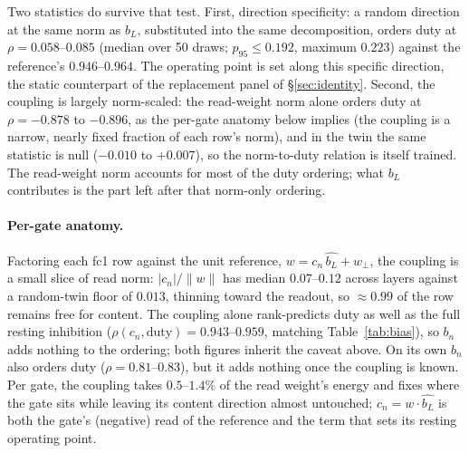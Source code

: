 \documentclass[11pt]{article}
\newcommand{\bl}{b_L}
\begin{document}
Two statistics do survive that test. First, direction specificity: a
random direction at the same norm as $\bl$, substituted into the same
decomposition, orders duty at $\rho = 0.058$--$0.085$ (median over 50
draws; $p_{95} \leq 0.192$, maximum $0.223$) against the reference's
$0.946$--$0.964$. The operating point is set along this specific
direction, the static counterpart of the replacement panel of \S\ref{sec:identity}. Second, the coupling is
largely norm-scaled: the read-weight norm alone orders duty at
$\rho = -0.878$ to $-0.896$, as the per-gate anatomy below implies (the coupling is a
narrow, nearly fixed fraction of each row's norm), and in the twin the same statistic is null ($-0.010$ to
$+0.007$), so the norm-to-duty relation is itself trained. The
read-weight norm accounts for most of the duty ordering; what $\bl$
contributes is the part left after that norm-only ordering.

\paragraph{Per-gate anatomy.} Factoring each fc1 row against the unit
reference, $w = c_n\,\hat{\bl} + w_\perp$, the coupling is a small
slice of read norm: $|c_n|/\|w\|$ has median $0.07$--$0.12$ across
layers against a random-twin floor of $0.013$, thinning toward the
readout, so $\approx 0.99$ of the row remains free for content. The
coupling alone rank-predicts duty as well as the full resting
inhibition ($\rho(c_n,\text{duty}) = 0.943$--$0.959$, matching
Table~\ref{tab:bias}), so $b_n$ adds nothing to the ordering; both
figures inherit the caveat above. On its own $b_n$ also orders
duty ($\rho = 0.81$--$0.83$), but it adds nothing once the coupling is
known. Per gate, the coupling takes $0.5$--$1.4\%$ of the read weight's
energy and fixes where the gate sits while leaving its content direction
almost untouched; $c_n = w\cdot\hat{\bl}$ is both the gate's (negative)
read of the reference and the term that sets its resting operating point.
\end{document}

